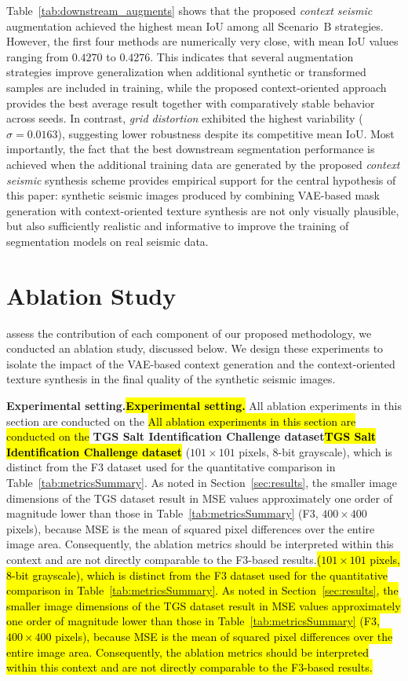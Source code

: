 \documentclass{ieeeaccess}
\DeclareRobustCommand{\DIFaddbegin}{\DIFOaddbegin \let\includegraphics\DIFaddincludegraphics} %
\DeclareRobustCommand{\DIFaddend}{\DIFOaddend \let\includegraphics\DIFOincludegraphics} %
\providecommand{\DIFadd}[1]{{\protect\color{blue}#1}}
\renewcommand{\DIFadd}[1]{\ifmmode#1\else\begingroup\let\protect\relax\hl{#1}\endgroup\fi}
\providecommand{\DIFaddbegin}{}
\providecommand{\DIFaddend}{}
\renewcommand{\DIFaddbegin}{}
\renewcommand{\DIFaddend}{}
\begin{document}
Table~\ref{tab:downstream_augments} shows that the proposed \emph{context seismic} augmentation achieved the highest mean IoU among all Scenario~B strategies. However, the first four methods are numerically very close, with mean IoU values ranging from $0.4270$ to $0.4276$. This indicates that several augmentation strategies improve generalization when additional synthetic or transformed samples are included in training, while the proposed context-oriented approach provides the best average result together with comparatively stable behavior across seeds. In contrast, \emph{grid distortion} exhibited the highest variability ($\sigma = 0.0163$), suggesting lower robustness despite its competitive mean IoU. Most importantly, the fact that the best downstream segmentation performance is achieved when the additional training data are generated by the proposed \emph{context seismic} synthesis scheme provides empirical support for the central hypothesis of this paper: synthetic seismic images produced by combining VAE-based mask generation with context-oriented texture synthesis are not only visually plausible, but also sufficiently realistic and informative to improve the training of segmentation models on real seismic data.

\DIFaddend \section{Ablation Study}
\label{sec:ablation}

 assess the contribution of each component of our proposed methodology, we conducted an ablation study, discussed below. We design these experiments to isolate the impact of the VAE-based context generation and the context-oriented texture synthesis in the final quality of the synthetic seismic images.

\DIFaddbegin \noindent\DIFadd{\textbf{Experimental setting.}} \DIFadd{All ablation experiments in this section are conducted on the }\DIFadd{\textbf{TGS Salt Identification Challenge dataset}} \DIFadd{($101 \times 101$ pixels, 8-bit grayscale), which is distinct from the F3 dataset used for the quantitative comparison in Table~\protect\ref{tab:metricsSummary}. As noted in Section~\protect\ref{sec:results}, the smaller image dimensions of the TGS dataset result in MSE values approximately one order of magnitude lower than those in Table~\protect\ref{tab:metricsSummary} (F3, $400 \times 400$ pixels), because MSE is the mean of squared pixel differences over the entire image area. Consequently, the ablation metrics should be interpreted within this context and are not directly comparable to the F3-based results.}
\end{document}
